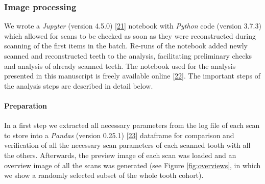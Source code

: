 \documentclass[
  american,
]{article}
\begin{document}
\hypertarget{image-processing}{%
\subsubsection{Image processing}\label{image-processing}}

We wrote a \emph{Jupyter} (version 4.5.0) {[}\protect\hyperlink{ref-pQ6Wbz73}{21}{]} notebook with \emph{Python} code (version 3.7.3) which allowed for scans to be checked as soon as they were reconstructed during scanning of the first items in the batch.
Re-runs of the notebook added newly scanned and reconstructed teeth to the analysis, facilitating preliminary checks and analysis of already scanned teeth.
The notebook used for the analysis presented in this manuscript is freely available online {[}\protect\hyperlink{ref-tZRGGuMm}{22}{]}.
The important steps of the analysis steps are described in detail below.

\hypertarget{preparation}{%
\paragraph{Preparation}\label{preparation}}

In a first step we extracted all necessary parameters from the log file of each scan to store into a \emph{Pandas} (version 0.25.1) {[}\protect\hyperlink{ref-U5AcoDOX}{23}{]} dataframe for comparison and verification of all the necessary scan parameters of each scanned tooth with all the others.
Afterwards, the preview image of each scan was loaded and an overview image of all the scans was generated (see Figure \ref{fig:overviews}, in which we show a randomly selected subset of the whole tooth cohort).
\end{document}
